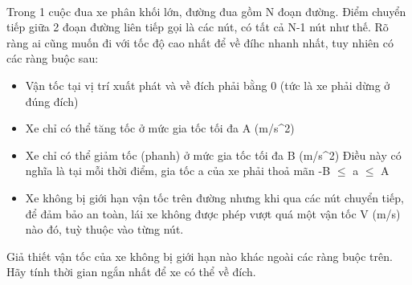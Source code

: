  

Trong 1 cuộc đua xe phân khối lớn, đường đua gồm N đoạn đường. Điểm chuyển tiếp giữa 2 đoạn đường liên tiếp gọi là các nút, có tất cả N-1 nút như thế. Rõ ràng ai cũng muốn đi với tốc độ cao nhất để về đíhc nhanh nhất, tuy nhiên có các ràng buộc sau:
\begin{itemize}
	\item Vận tốc tại vị trí xuất phát và về đích phải bằng 0 (tức là xe phải dừng ở đúng đích)
	\item Xe chỉ có thể tăng tốc ở mức gia tốc tối đa A (m/s^2)
	\item Xe chỉ có thể giảm tốc (phanh) ở mức gia tốc tối đa B (m/s^2) Điều này có nghĩa là tại mỗi thời điểm, gia tốc a của xe phải thoả mãn -B $\le$ a $\le$ A
	\item Xe không bị giới hạn vận tốc trên đường nhưng khi qua các nút chuyển tiếp, để đảm bảo an toàn, lái xe không được phép vượt quá một vận tốc V (m/s) nào đó, tuỳ thuộc vào từng nút.
\end{itemize}

Giả thiết vận tốc của xe không bị giới hạn nào khác ngoài các ràng buộc trên. Hãy tính thời gian ngắn nhất để xe có thể về đích.